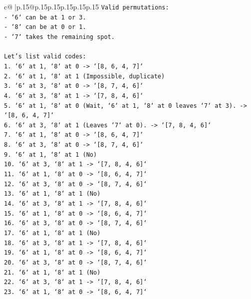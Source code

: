 \documentclass{article}
\begin{document}
{\begin{supertabular}{c@{$\;$}|p{.15\linewidth}@{}p{.15\linewidth}p{.15\linewidth}p{.15\linewidth}p{.15\linewidth}p{.15\linewidth}}
{{{\texttt{Valid permutations:} \\
\texttt{{-} `6` can be at 1 or 3.} \\
\texttt{{-} `8` can be at 0 or 1.} \\
\texttt{{-} `7` takes the remaining spot.} \\
\\ 
\texttt{Let's list valid codes:} \\
\texttt{1.  `6` at 1, `8` at 0 {-}> `{[}8, 6, 4, 7{]}`} \\
\texttt{2.  `6` at 1, `8` at 1 (Impossible, duplicate)} \\
\texttt{3.  `6` at 3, `8` at 0 {-}> `{[}8, 7, 4, 6{]}`} \\
\texttt{4.  `6` at 3, `8` at 1 {-}> `{[}7, 8, 4, 6{]}`} \\
\texttt{5.  `6` at 1, `8` at 0 (Wait, `6` at 1, `8` at 0 leaves `7` at 3). {-}> `{[}8, 6, 4, 7{]}`} \\
\texttt{6.  `6` at 3, `8` at 1 (Leaves `7` at 0). {-}> `{[}7, 8, 4, 6{]}`} \\
\texttt{7.  `6` at 1, `8` at 0 {-}> `{[}8, 6, 4, 7{]}`} \\
\texttt{8.  `6` at 3, `8` at 0 {-}> `{[}8, 7, 4, 6{]}`} \\
\texttt{9.  `6` at 1, `8` at 1 (No)} \\
\texttt{10. `6` at 3, `8` at 1 {-}> `{[}7, 8, 4, 6{]}`} \\
\texttt{11. `6` at 1, `8` at 0 {-}> `{[}8, 6, 4, 7{]}`} \\
\texttt{12. `6` at 3, `8` at 0 {-}> `{[}8, 7, 4, 6{]}`} \\
\texttt{13. `6` at 1, `8` at 1 (No)} \\
\texttt{14. `6` at 3, `8` at 1 {-}> `{[}7, 8, 4, 6{]}`} \\
\texttt{15. `6` at 1, `8` at 0 {-}> `{[}8, 6, 4, 7{]}`} \\
\texttt{16. `6` at 3, `8` at 0 {-}> `{[}8, 7, 4, 6{]}`} \\
\texttt{17. `6` at 1, `8` at 1 (No)} \\
\texttt{18. `6` at 3, `8` at 1 {-}> `{[}7, 8, 4, 6{]}`} \\
\texttt{19. `6` at 1, `8` at 0 {-}> `{[}8, 6, 4, 7{]}`} \\
\texttt{20. `6` at 3, `8` at 0 {-}> `{[}8, 7, 4, 6{]}`} \\
\texttt{21. `6` at 1, `8` at 1 (No)} \\
\texttt{22. `6` at 3, `8` at 1 {-}> `{[}7, 8, 4, 6{]}`} \\
\texttt{23. `6` at 1, `8` at 0 {-}> `{[}8, 6, 4, 7{]}`} \\
}}}
\end{supertabular}}
\end{document}
